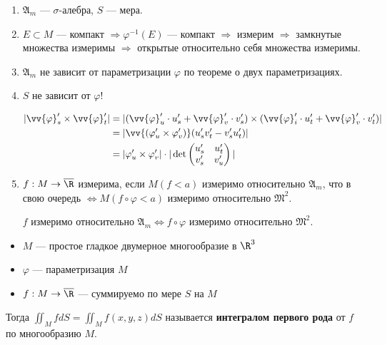 \begin{remark}\itemfix
    \begin{enumerate}
        \item \(\mathfrak{A}_m\) --- \(\sigma\)-алебра, \(S\) --- мера.
        \item \(E\subset M\) --- компакт \( \Rightarrow \varphi^{-1}(E)\) --- компакт \( \Rightarrow \) измерим \( \Rightarrow \) замкнутые множества измеримы \( \Rightarrow \) открытые относительно себя множества измеримы.
        \item \(\mathfrak{A}_m\) не зависит от параметризации \(\varphi\) по теореме о двух параметризациях.
        \item \(S\) не зависит от \(\varphi\)!

              \begin{align*}
                  |\vv{\varphi}'_s \times \vv{\varphi}'_t| & = |(\vv{\varphi}'_u \cdot u'_s + \vv{\varphi}'_v \cdot v'_s) \times (\vv{\varphi}'_i \cdot u'_t + \vv{\varphi}'_v \cdot v'_t)| \\
                                                           & = |\vv{(\varphi'_u \times \varphi'_v)}(u'_s v'_t - v'_s u'_t)|                                                                 \\
                                                           & = |\varphi'_u \times \varphi'_v| \cdot |\det \begin{pmatrix} u'_s & u'_t \\ v'_s & v'_u \end{pmatrix} |
              \end{align*}

        \item \(f : M \to \overline\R\) измерима, если \(M(f < a)\) измеримо относительно \(\mathfrak{A}_m\), что в свою очередь \(\Leftrightarrow M(f \circ \varphi < a)\) измеримо относительно \(\mathfrak{M}^2\).

              \(f\) измеримо относительно \(\mathfrak{A}_m \Leftrightarrow f \circ \varphi\) измеримо относительно \(\mathfrak{M}^2\).
    \end{enumerate}
\end{remark}

\begin{definition}\itemfix
    \begin{itemize}
        \item \(M\) --- простое гладкое двумерное многообразие в \(\R^3\)
        \item \(\varphi\) --- параметризация \(M\)
        \item \(f : M \to \overline \R\) --- суммируемо по мере \(S\) на \(M\)
    \end{itemize}

    Тогда \(\iint_M f dS = \iint_M f(x, y, z) dS\) называется \textbf{интегралом первого рода} от \(f\) по многообразию \(M\).
\end{definition}

